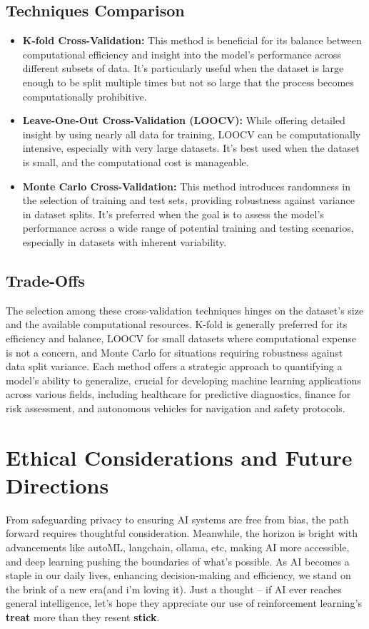 \documentclass[11pt, a4paper]{article}
\begin{document}
\subsection{Techniques Comparison}
\begin{itemize}
\item \textbf{K-fold Cross-Validation:} This method is beneficial for its balance between computational efficiency and insight into the model's performance across different subsets of data. It's particularly useful when the dataset is large enough to be split multiple times but not so large that the process becomes computationally prohibitive.
\item \textbf{Leave-One-Out Cross-Validation (LOOCV):} While offering detailed insight by using nearly all data for training, LOOCV can be computationally intensive, especially with very large datasets. It's best used when the dataset is small, and the computational cost is manageable.
\item \textbf{Monte Carlo Cross-Validation:} This method introduces randomness in the selection of training and test sets, providing robustness against variance in dataset splits. It's preferred when the goal is to assess the model's performance across a wide range of potential training and testing scenarios, especially in datasets with inherent variability.
\end{itemize}

\subsection{Trade-Offs}
The selection among these cross-validation techniques hinges on the dataset's size and the available computational resources. K-fold is generally preferred for its efficiency and balance, LOOCV for small datasets where computational expense is not a concern, and Monte Carlo for situations requiring robustness against data split variance. Each method offers a strategic approach to quantifying a model's ability to generalize, crucial for developing machine learning applications across various fields, including healthcare for predictive diagnostics, finance for risk assessment, and autonomous vehicles for navigation and safety protocols.


\section{Ethical Considerations and Future Directions}
From safeguarding privacy to ensuring AI systems are free from bias, the path forward requires thoughtful consideration. Meanwhile, the horizon is bright with advancements like autoML, langchain, ollama, etc, making AI more accessible, and deep learning pushing the boundaries of what's possible. As AI becomes a staple in our daily lives, enhancing decision-making and efficiency, we stand on the brink of a new era(and i'm loving it). Just a thought – if AI ever reaches general intelligence, let's hope they appreciate our use of reinforcement learning's \textbf{treat} more than they resent \textbf{stick}.
\end{document}
